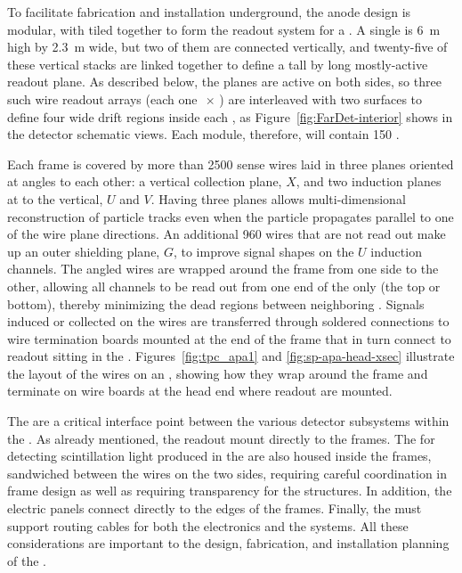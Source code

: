 To facilitate fabrication and installation underground, the anode design is modular, with  tiled together to form the readout system for a \nominalmodsize {}. A single  is \SI{6}{m} high by \SI{2.3}{m} wide, but two of them are connected vertically, and twenty-five of these vertical stacks are linked together to define a \tpcheight %
tall by \sptpclen %
long mostly-active readout plane.  As described below, the planes are active on both sides, so three such wire readout arrays (each one \tpcheight$\,\times\,$\sptpclen) %
are interleaved with two  surfaces to define four \spmaxdrift %
wide drift regions inside each , as Figure~\ref{fig:FarDet-interior} shows in the detector schematic views. Each  \nominalmodsize module, therefore, will contain 150 .

Each  frame is covered by more than \num{2500} sense wires laid in three planes  oriented at angles to each other: a vertical collection plane, $X$, and two induction planes at \apainducwireangle to the vertical, $U$ and $V$. Having three planes allows multi-dimensional reconstruction of particle tracks even when the particle propagates parallel to one of the wire plane directions.  An additional \num{960} wires that are not read out make up an outer shielding plane, $G$, to improve signal shapes on the $U$ induction channels.  The angled wires are wrapped around the frame from one side to the other, allowing all channels to be read out from one end of the  only (the top or bottom), thereby minimizing the dead regions between neighboring . Signals induced or collected on the wires are transferred through soldered connections to wire termination boards mounted at the end of the  frame that in turn connect to  readout  sitting in the .  Figures~\ref{fig:tpc_apa1} and \ref{fig:sp-apa-head-xsec} illustrate the layout of the wires on an , showing how they wrap around the frame and terminate on wire boards at the head end where readout  are mounted.

The  are a critical interface point between the various detector subsystems within the .  As already mentioned, the  readout  mount directly to the  frames.  The  for detecting scintillation light produced in the  are also housed inside the frames, sandwiched between the wires on the two sides, requiring careful coordination in frame design as well as requiring transparency for the  structures.  In addition, the electric  panels connect directly to the edges of the  frames.  Finally, the  must support routing cables for both the  electronics and the  systems. All these considerations are important to the design, fabrication, and installation planning of the .

